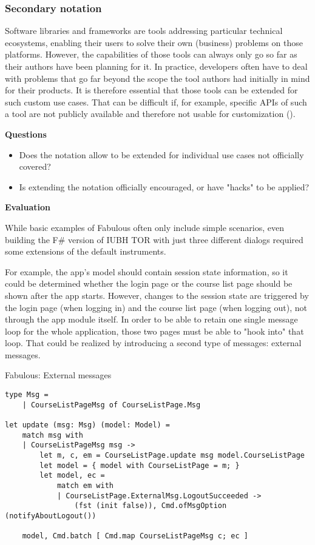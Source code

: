 \subsubsection{Secondary notation}

Software libraries and frameworks are tools addressing particular technical ecosystems, enabling their users to solve their own (business) problems on those platforms. However, the capabilities of those tools can always only go so far as their authors have been planning for it. In practice, developers often have to deal with problems that go far beyond the scope the tool authors had initially in mind for their products. It is therefore essential that those tools can be extended for such custom use cases. That can be difficult if, for example, specific APIs of such a tool are not publicly available and therefore not usable for customization (\cite{zibran_useful_2011}).

\textbf{Questions}

\begin{itemize}
\item Does the notation allow to be extended for individual use cases not officially covered?
\item Is extending the notation officially encouraged, or have "hacks" to be applied?
\end{itemize}

\textbf{Evaluation}

While basic examples of Fabulous often only include simple scenarios, even building the F\# version of IUBH TOR with just three different dialogs required some extensions of the default instruments. 

For example, the app's model should contain session state information, so it could be determined whether the login page or the course list page should be shown after the app starts. However, changes to the session state are triggered by the login page (when logging in) and the course list page (when logging out), not through the app module itself. In order to be able to retain one single message loop for the whole application, those two pages must be able to "hook into" that loop. That could be realized by introducing a second type of messages: external messages.

\begin{listing}[H]
\caption{Fabulous: External messages}
\begin{verbatim}
type Msg =
    | CourseListPageMsg of CourseListPage.Msg

let update (msg: Msg) (model: Model) =
    match msg with
    | CourseListPageMsg msg ->
        let m, c, em = CourseListPage.update msg model.CourseListPage
        let model = { model with CourseListPage = m; }
        let model, ec =
            match em with
            | CourseListPage.ExternalMsg.LogoutSucceeded ->
                (fst (init false)), Cmd.ofMsgOption (notifyAboutLogout())
        
    model, Cmd.batch [ Cmd.map CourseListPageMsg c; ec ]
\end{verbatim}
\end{listing}

